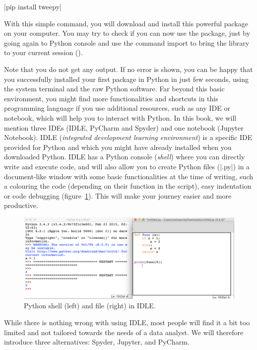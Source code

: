 |pip install tweepy|

With this simple command, you will download and install this powerful
package on your computer. You may try to check if you can now use the
package, just by going again to Python console and use the command
import to bring the library to your current session ().


Note that you do not get any output. If no error is shown, you can be happy that you successfully
installed your first package in Python in just few seconds, using the
system terminal and the raw Python software. Far beyond this basic
environment, you might find more functionalities and shortcuts in this
programming language if you use additional resources, such as any IDE
or notebook, which will help you to interact with Python. In this
book, we will mention three IDEs (IDLE, PyCharm and Spyder) and one
notebook (Jupyter Notebook). IDLE (\emph{integrated development
  learning environment}) is a specific IDE provided for Python and
which you might have already installed when you downloaded
Python. IDLE has a Python console (\emph{shell}) where you can directly
write and execute code, and will also allow you to create Python files
(|.py|) in a document-like window with some basic functionalities at the
time of writing, such a colouring the code (depending on their
function in the script), easy indentation or code debugging
(figure~\ref{fig:python_idle}).  This will make your journey easier
and more productive.

\begin{figure}
\centering
\includegraphics[width=0.9\linewidth]{figures/ch3_python_idle}
\caption{Python shell (left) and file (right) in IDLE.}
\label{fig:python_idle}
\end{figure}

While there is nothing wrong with using IDLE, most people will
find it a bit too limited and not tailored towards the needs of
a data analyst. We will therefore introduce three alternatives:
Spyder, Jupyter, and PyCharm.


